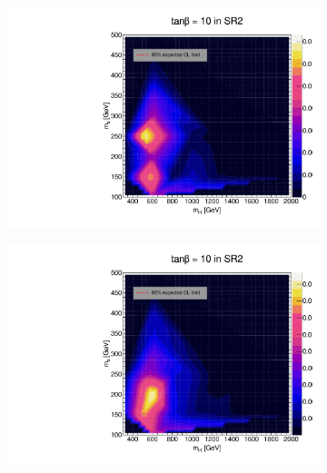 \documentclass[12pt, a4paper]{book}
\begin{document}
\begin{figure}[!ht]
\begin{subfigure}[b]{0.49\textwidth}
   \end{subfigure}
   \hfill
   \begin{subfigure}[b]{0.49\textwidth}
      \centering
      \includegraphics[width=1\textwidth]{Limits/Model_independent/100-150/2HDM/2HDM_ee_tb10.pdf}
   \end{subfigure}
   \hfill
   \begin{subfigure}[b]{0.49\textwidth}
      \centering
      \includegraphics[width=1\textwidth]{Limits/Model_independent/100-150/2HDM/2HDM_uu_tb10.pdf}
   \end{subfigure}
   \hfill
	\begin{subfigure}[b]{0.49\textwidth}
      \centering

\end{subfigure}
\end{figure}
\end{document}
